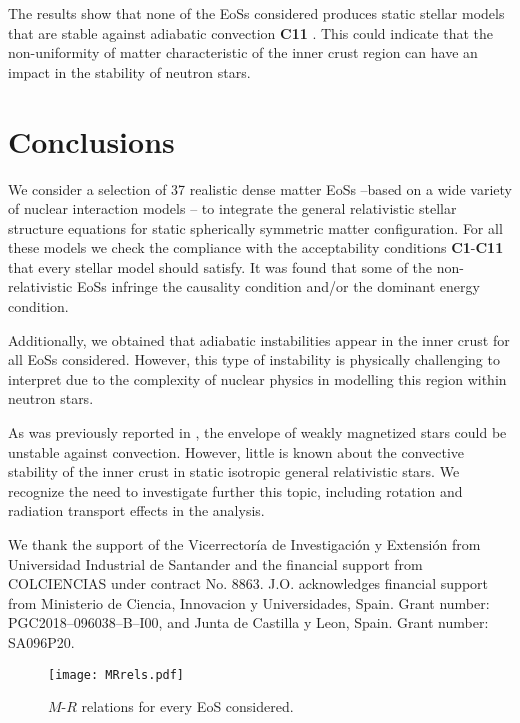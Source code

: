 \documentclass[a4paper]{jpconf} %
\begin{document}
The results show that none of the EoSs considered produces static stellar models that are stable against adiabatic convection {\bf C11} \cite{HernandezNunezVasquez2018}. This could indicate that the non-uniformity of matter characteristic of the inner crust region can have an impact in the stability of neutron stars.

\section{Conclusions}\label{conclusions}
We consider a selection of 37 realistic dense matter EoSs --based on a wide variety of nuclear interaction models \cite{OzelFreire2016}-- to integrate the general relativistic stellar structure equations for static spherically symmetric matter configuration.  For all these models we check the compliance with the acceptability conditions {\bf C1}-{\bf C11} that every stellar model should satisfy. It was found that some of the non-relativistic EoSs infringe the causality condition and/or the dominant energy condition. 

Additionally, we obtained that adiabatic instabilities appear in the inner crust for all EoSs considered. However, this type of instability is physically challenging to interpret due to the complexity of nuclear physics in modelling this region within neutron stars.

As was previously reported in \cite{MirallesUrpinRiper1997}, the envelope of weakly magnetized stars could be unstable against convection. However, little is known about the convective stability of the inner crust in static isotropic general relativistic stars. We recognize the need to investigate further this topic, including rotation and radiation transport effects in the analysis. 

\ack%
We thank the support of the Vicerrectoría de Investigación y Extensión from Universidad Industrial de Santander and the financial support from COLCIENCIAS under contract No. 8863.
 J.O. acknowledges financial support from  Ministerio de
Ciencia, Innovacion y Universidades, Spain. Grant number:
PGC2018–096038–B–I00, and Junta de Castilla y Leon, Spain.
Grant number: SA096P20.

\begin{figure}%
    \centering
    \texttt{[image: MRrels.pdf]}
    \caption{$M$-$R$ relations for every EoS considered.} 
    \label{MRrel}
\end{figure}
\end{document}
